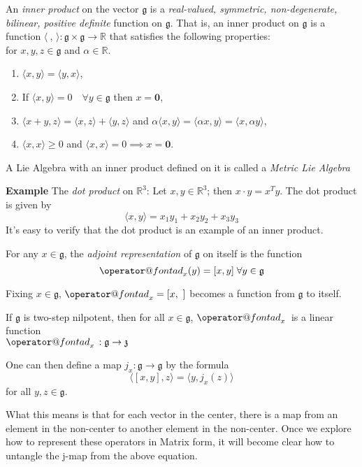 \documentclass[11 pt]{article}
\makeatletter
\renewcommand{\a}{\alpha}
\newcommand{\br}[2]{\left[#1,#2\right]}
\newcommand{\inp}[2]{\langle #1, #2 \rangle}
\newcommand{\inpe}{\inp{\ }{\,}}
\newcommand{\lag}[1]{\mathfrak{#1}}
\newcommand{\R}{\mathbb{R}}
\newcommand{\fg}{\mathfrak{g}}
\newcommand{\fz}{\mathfrak{z}}
\newcommand{\zvec}{\mathbf{0}}
\newcommand{\RR}{\mathbb{R}}
\newcommand{\ad}[1]{\mathop{\operator@font ad}\nolimits_{#1}}
\makeatother
\begin{document}
\begin{definition}
    An \emph{inner product} on the vector $\fg$ is a
    \emph{real-valued, symmetric, non-degenerate, bilinear, positive definite}
    function on $\fg$.  That is, an inner product on $\fg$ is a function
    $\inpe:\fg\times\fg\to\RR$ that satisfies the
    following properties:
    \\for $x,y,z \in \fg$ and $\a \in \RR$.
    \begin{enumerate}
        \item $\langle x,y \rangle = \langle y,x \rangle$,
        \item If $\langle x,y \rangle = 0 \quad \forall y \in \fg$
            then $x = \zvec$,
        \item
            $\langle x+y,z \rangle = \langle x,z \rangle + \langle y,z \rangle$
            and $\a \langle x,y \rangle = \langle \a x,y \rangle
            = \langle x,\a y \rangle$,
        \item $\langle x,x \rangle \geq 0$
            and $\langle x,x\rangle = 0 \implies x=\zvec$.
    \end{enumerate}
    A Lie Algebra with an inner product defined on it is called a
    \emph{Metric Lie Algebra}
\end{definition}
{\bf Example} The \emph{dot product} on $\R^3$:
Let $x, y \in \R^3$; then $x \cdot y = x^Ty$.  The dot product is given by
\[
    \langle x,y \rangle =  x_1y_1 + x_2y_2 + x_3y_3
\]
It's easy to verify that the dot product is an example of an inner product.

\begin{definition}
    For any $x \in \fg$, the \emph{adjoint representation} of $\fg$ on itself is
    the function
    \[
        \ad{x}(y) = [x,y] \; \forall y \in \fg
    \]
\end{definition}

Fixing $x \in \lag{g}$, $\ad{x} = \br{x}{\ }$ becomes a function from
$\lag{g}$ to itself.

If $\fg$ is two-step nilpotent, then for all $x \in \fg$, $\ad{x}{}$ is a
linear function
\\$\ad{x}{}: \fg \to \fz$

\begin{definition}
    One can then define a map $j_x :\lag{g} \to \lag{g}$ by the formula
    \[
    \langle\br{x}{y},z\rangle = \langle y,j_x(z)\rangle
    \]
    for all $y, z \in \lag{g}$.
\end{definition}

What this means is that for each vector in the center, there is a map from an
element in the non-center to another element in the non-center.  Once we
explore how to represent these operators in Matrix form, it will become clear
how to untangle the j-map from the above equation.
\end{document}
